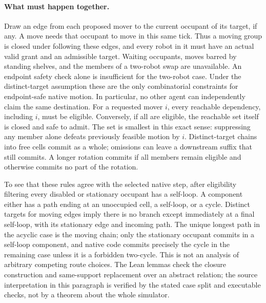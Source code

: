 \documentclass[11pt]{article}
\begin{document}
\paragraph{What must happen together.}
Draw an edge from each proposed mover to the current occupant of its target, if any. A move needs that occupant to move in this same tick. Thus a moving group is closed under following these edges, and every robot in it must have an actual valid grant and an admissible target. Waiting occupants, moves barred by standing shelves, and the members of a two-robot swap are unavailable. An endpoint safety check alone is insufficient for the two-robot case. Under the distinct-target assumption these are the only combinatorial constraints for endpoint-safe native motion. In particular, no other agent can independently claim the same destination. For a requested mover $i$, every reachable dependency, including $i$, must be eligible. Conversely, if all are eligible, the reachable set itself is closed and safe to admit. The set is smallest in this exact sense: suppressing any member alone defeats previously feasible motion by $i$. Distinct-target chains into free cells commit as a whole; omissions can leave a downstream suffix that still commits. A longer rotation commits if all members remain eligible and otherwise commits no part of the rotation.

To see that these rules agree with the selected native step, after eligibility filtering every disabled or stationary occupant has a self-loop. A component either has a path ending at an unoccupied cell, a self-loop, or a cycle. Distinct targets for moving edges imply there is no branch except immediately at a final self-loop, with its stationary edge and incoming path. The unique longest path in the acyclic case is the moving chain; only the stationary occupant commits in a self-loop component, and native code commits precisely the cycle in the remaining case unless it is a forbidden two-cycle. This is not an analysis of arbitrary competing route choices. The Lean lemmas check the closure construction and same-support replacement over an abstract relation; the source interpretation in this paragraph is verified by the stated case split and executable checks, not by a theorem about the whole simulator.
\end{document}
